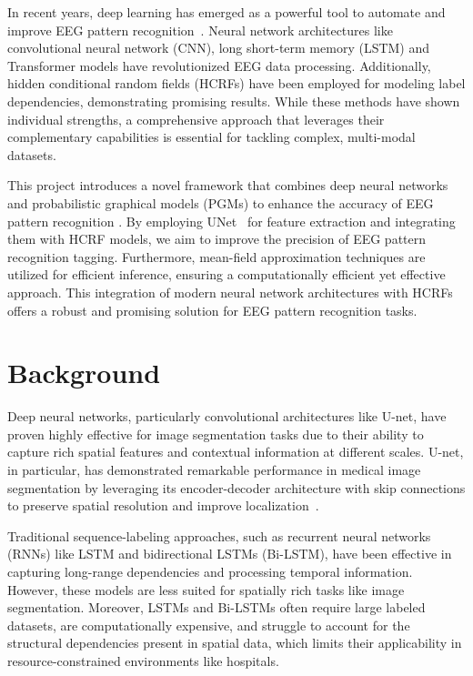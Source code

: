 \documentclass[conference]{IEEEtran}
\begin{document}
In recent years, deep learning has emerged as a powerful tool to automate and
improve EEG pattern recognition~\citep{craik2019deep}. Neural network
architectures like convolutional neural network (CNN), long short-term memory
(LSTM) and Transformer models have revolutionized EEG data processing.
Additionally, hidden conditional random fields (HCRFs) have been employed for
modeling label dependencies, demonstrating promising results.
While these methods have shown individual strengths, a comprehensive
approach that leverages their complementary capabilities is essential for
tackling complex, multi-modal datasets.


This project introduces a novel framework that combines deep neural networks
and probabilistic graphical models (PGMs) to enhance the accuracy of EEG
pattern recognition . By employing UNet~\citep{ronneberger2015unet} for feature
extraction and integrating them with HCRF models, we aim to improve the
precision of EEG pattern recognition tagging. Furthermore, mean-field
approximation techniques are utilized for efficient inference, ensuring a
computationally efficient yet effective approach.
This integration of modern neural network architectures with HCRFs offers
a robust and promising solution for EEG pattern recognition tasks.


\section{Background}


Deep neural networks, particularly convolutional architectures like U-net, have 
proven highly effective for image segmentation tasks due to their ability to
capture rich spatial features and contextual information at different scales.
U-net, in particular, has demonstrated remarkable performance in medical image
segmentation by leveraging its encoder-decoder architecture with skip
connections to preserve spatial resolution and improve
localization~\citep{ronneberger2015unet,zhou2018unet}.


Traditional sequence-labeling approaches, such as recurrent neural networks
(RNNs) like LSTM and bidirectional LSTMs (Bi-LSTM), have been effective in
capturing long-range dependencies and processing temporal information. However,
these models are less suited for spatially rich tasks like image segmentation.
Moreover, LSTMs and Bi-LSTMs often require large labeled datasets, are
computationally expensive, and struggle to account for the structural
dependencies present in spatial data, which limits their applicability in
resource-constrained environments like hospitals.
\end{document}
